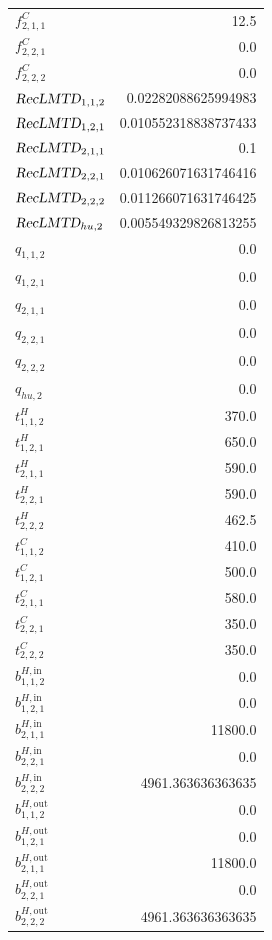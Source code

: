 \documentclass{article}%
\begin{document}
\begin{multicols*}{3}
\begin{supertabular}{lr}
	$f_{2,1,1}^{C}$ & 12.5 \\%
	$f_{2,2,1}^{C}$ & 0.0 \\%
	$f_{2,2,2}^{C}$ & 0.0 \\%
	$\textsl{RecLMTD}_{1,1,2}$ & 0.02282088625994983 \\%
	$\textsl{RecLMTD}_{1,2,1}$ & 0.010552318838737433 \\%
	$\textsl{RecLMTD}_{2,1,1}$ & 0.1 \\%
	$\textsl{RecLMTD}_{2,2,1}$ & 0.010626071631746416 \\%
	$\textsl{RecLMTD}_{2,2,2}$ & 0.011266071631746425 \\%
	$\textsl{RecLMTD}_{hu,2}$ & 0.005549329826813255 \\%
	$q_{1,1,2}$ & 0.0 \\%
	$q_{1,2,1}$ & 0.0 \\%
	$q_{2,1,1}$ & 0.0 \\%
	$q_{2,2,1}$ & 0.0 \\%
	$q_{2,2,2}$ & 0.0 \\%
	$q_{hu,2}$ & 0.0 \\%
	$t_{1,1,2}^{H}$ & 370.0 \\%
	$t_{1,2,1}^{H}$ & 650.0 \\%
	$t_{2,1,1}^{H}$ & 590.0 \\%
	$t_{2,2,1}^{H}$ & 590.0 \\%
	$t_{2,2,2}^{H}$ & 462.5 \\%
	$t_{1,1,2}^{C}$ & 410.0 \\%
	$t_{1,2,1}^{C}$ & 500.0 \\%
	$t_{2,1,1}^{C}$ & 580.0 \\%
	$t_{2,2,1}^{C}$ & 350.0 \\%
	$t_{2,2,2}^{C}$ & 350.0 \\%
	$b_{1,1,2}^{H,\text{in}}$ & 0.0 \\%
	$b_{1,2,1}^{H,\text{in}}$ & 0.0 \\%
	$b_{2,1,1}^{H,\text{in}}$ & 11800.0 \\%
	$b_{2,2,1}^{H,\text{in}}$ & 0.0 \\%
	$b_{2,2,2}^{H,\text{in}}$ & 4961.363636363635 \\%
	$b_{1,1,2}^{H,\text{out}}$ & 0.0 \\%
	$b_{1,2,1}^{H,\text{out}}$ & 0.0 \\%
	$b_{2,1,1}^{H,\text{out}}$ & 11800.0 \\%
	$b_{2,2,1}^{H,\text{out}}$ & 0.0 \\%
	$b_{2,2,2}^{H,\text{out}}$ & 4961.363636363635 \\%

\end{supertabular}
\end{multicols*}
\end{document}
